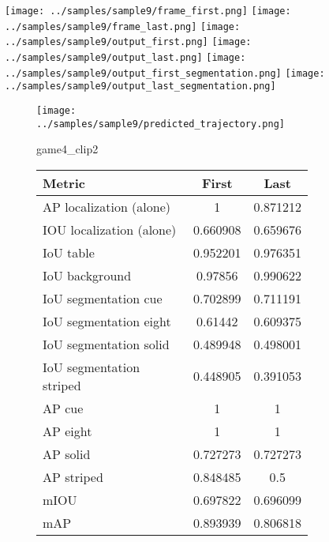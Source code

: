 \begin{figure}
    \texttt{[image: ../samples/sample9/frame\_first.png]}
    \texttt{[image: ../samples/sample9/frame\_last.png]}
    \newline
    \texttt{[image: ../samples/sample9/output\_first.png]}
    \texttt{[image: ../samples/sample9/output\_last.png]}
    \newline
    \texttt{[image: ../samples/sample9/output\_first\_segmentation.png]}
    \texttt{[image: ../samples/sample9/output\_last\_segmentation.png]}
    \newline
    \begin{subfigure}[b]{0.49\textwidth}
        \vspace{20pt}
        \texttt{[image: ../samples/sample9/predicted\_trajectory.png]}
        \caption*{game4\_clip2}
    \end{subfigure}
\begin{subfigure}[b]{0.49\textwidth}
    \begin{tabular}{|l|c|c|}
        \hline
        \textbf{Metric} & \textbf{First} & \textbf{Last} \\
        \hline
        AP localization (alone) & 1 & 0.871212 \\ 
        IOU localization (alone) & 0.660908 & 0.659676 \\ 
        \hline
        IoU table & 0.952201 & 0.976351 \\ 
        IoU background & 0.97856 & 0.990622 \\ 
        \hline
        IoU segmentation cue & 0.702899 & 0.711191 \\ 
        IoU segmentation eight & 0.61442 & 0.609375 \\ 
        IoU segmentation solid & 0.489948 & 0.498001 \\ 
        IoU segmentation striped & 0.448905 & 0.391053 \\ 
        \hline
        AP cue & 1 & 1 \\ 
        AP eight & 1 & 1 \\ 
        AP solid & 0.727273 & 0.727273 \\ 
        AP striped & 0.848485 & 0.5 \\ 
        \hline
        mIOU & 0.697822 & 0.696099 \\ 
        mAP & 0.893939 & 0.806818 \\ 
        \hline
    \end{tabular}    
\end{subfigure}
\end{figure}